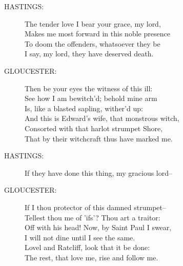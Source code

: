\documentclass{article}
\begin{document}
\begin{description}
\item[HASTINGS:] 
\hspace{1pt}The tender love I bear your grace, my lord,\\
\hspace{1pt}Makes me most forward in this noble presence\\
\hspace{1pt}To doom the offenders, whatsoever they be\\
\hspace{1pt}I say, my lord, they have deserved death.\\
\end{description}
\begin{description}
\item[GLOUCESTER:] 
\hspace{1pt}Then be your eyes the witness of this ill:\\
\hspace{1pt}See how I am bewitch'd; behold mine arm\\
\hspace{1pt}Is, like a blasted sapling, wither'd up:\\
\hspace{1pt}And this is Edward's wife, that monstrous witch,\\
\hspace{1pt}Consorted with that harlot strumpet Shore,\\
\hspace{1pt}That by their witchcraft thus have marked me.\\
\end{description}
\begin{description}
\item[HASTINGS:] 
\hspace{1pt}If they have done this thing, my gracious lord--\\
\end{description}
\begin{description}
\item[GLOUCESTER:] 
\hspace{1pt}If I thou protector of this damned strumpet--\\
\hspace{1pt}Tellest thou me of 'ifs'?  Thou art a traitor:\\
\hspace{1pt}Off with his head! Now, by Saint Paul I swear,\\
\hspace{1pt}I will not dine until I see the same.\\
\hspace{1pt}Lovel and Ratcliff, look that it be done:\\
\hspace{1pt}The rest, that love me, rise and follow me.\\
\end{description}
\end{document}
